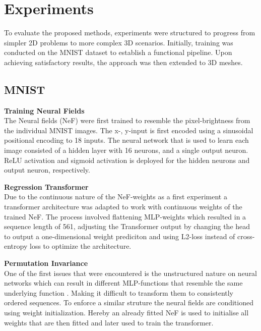 \section{Experiments}
\label{sec:exper}
To evaluate the proposed methods, experiments were structured to progress from simpler 2D problems to more complex 3D scenarios. Initially, training was conducted on the MNIST dataset to establish a functional pipeline. Upon achieving satisfactory results, the approach was then extended to 3D meshes.

\subsection*{MNIST }
\textbf{Training Neural Fields}\\
The Neural fields (NeF) were first trained to resemble the pixel-brightness from the individual MNIST images. The x-, y-input is first encoded using a sinusoidal positional encoding to 18 inputs. The neural network that is used to learn each image consisted of a hidden layer with 16 neurons, and a single output neuron. ReLU activation and sigmoid activation is deployed for the hidden neurons and output neuron, respectively.
\vspace{1em}

\noindent
\textbf{Regression Transformer }\\
Due to the continuous nature of the NeF-weights as a first experiment a transformer architecture was adapted to work with continuous weights of the trained NeF. The process involved flattening MLP-weights which resulted in a sequence length of 561, adjusting the Transformer output by changing the head to output a one-dimensional weight prediciton and using L2-loss instead of cross-entropy loss to optimize the architecture.
\vspace{1em}

\noindent
\textbf{Permutation Invariance}\\
One of the first issues that were encountered is the unstructured nature on neural networks which can result in different MLP-functions that resemble the same underlying function \cite{HechtNielsen1990ONTA}. Making it difficult to transform them to consistently ordered sequences. To enforce a similar struture the neural fields are conditioned using weight initialization. Hereby an already fitted NeF is used to initialise all weights that are then fitted and later used to train the transformer.
\vspace{1em}

